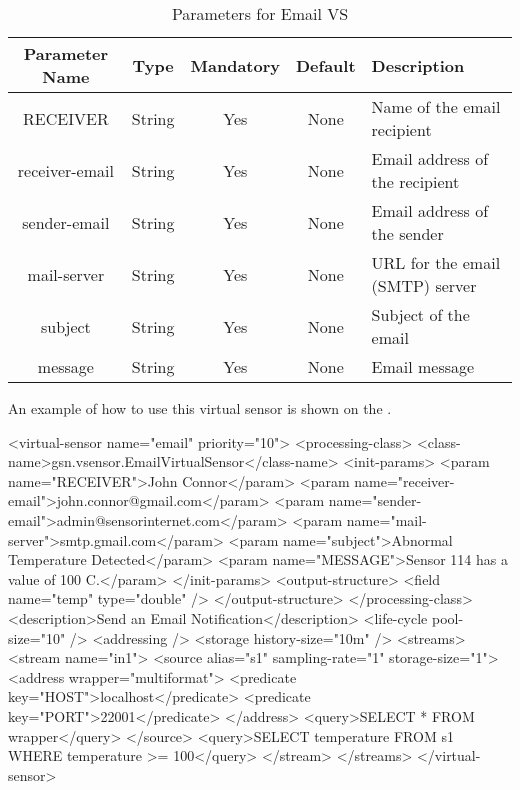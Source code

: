 \begin{table*}[!htp]
	\centering
	{\normalfont\footnotesize
	\begin{tabulary}{\textwidth}{|C|C|C|C|J|}%
	\hline
		\textbf{Parameter Name} &
		\textbf{Type} &
		\textbf{Mandatory} &
		\textbf{Default} &
		\textbf{Description} \\
	\hline
	\hline
		RECEIVER &
		String &	
		Yes &
		None &
		Name of the email recipient \\
	\hline
		receiver-email &
		String &	
		Yes &
		None &	
		Email address of the recipient \\
	\hline
		sender-email &
		String &	
		Yes &
		None &	
		Email address of the sender \\
	\hline
		mail-server &
		String &	
		Yes &
		None &	
		URL for the email (SMTP) server \\
	\hline
		subject &
		String &	
		Yes &
		None &	
		Subject of the email \\
	\hline
		message &
		String &	
		Yes &
		None &	
		Email message \\
	\hline
	\end{tabulary}
	}
	\caption{Parameters for Email VS}
	\label{table:parameters_email_vs}
\end{table*}

An example of how to use this virtual sensor is shown on the .

\begin{xmlcode}[caption={Sample of Email Notification VSD file}, label=listing:xml:emailnotification_vsd]
<virtual-sensor name="email" priority="10">
	<processing-class>
		<class-name>gsn.vsensor.EmailVirtualSensor</class-name>
		<init-params>
			<param name="RECEIVER">John Connor</param>
			<param name="receiver-email">john.connor@gmail.com</param>
			<param name="sender-email">admin@sensorinternet.com</param>
			<param name="mail-server">smtp.gmail.com</param>
			<param name="subject">Abnormal Temperature Detected</param>
			<param name="MESSAGE">Sensor 114 has a value of 100 C.</param>   
		</init-params>
		<output-structure>
			<field name="temp" type="double" />
		</output-structure>
	</processing-class>
	<description>Send an Email Notification</description>
	<life-cycle pool-size="10" />
	<addressing />
	<storage history-size="10m" />
	<streams>
		<stream name="in1">
			<source alias="s1" sampling-rate="1" storage-size="1">
				<address wrapper="multiformat">
					<predicate key="HOST">localhost</predicate>
					<predicate key="PORT">22001</predicate>
				</address>
				<query>SELECT * FROM wrapper</query>
			</source>
			<query>SELECT temperature FROM s1 WHERE temperature >= 100</query>
		</stream>
	</streams>
</virtual-sensor>
\end{xmlcode}


